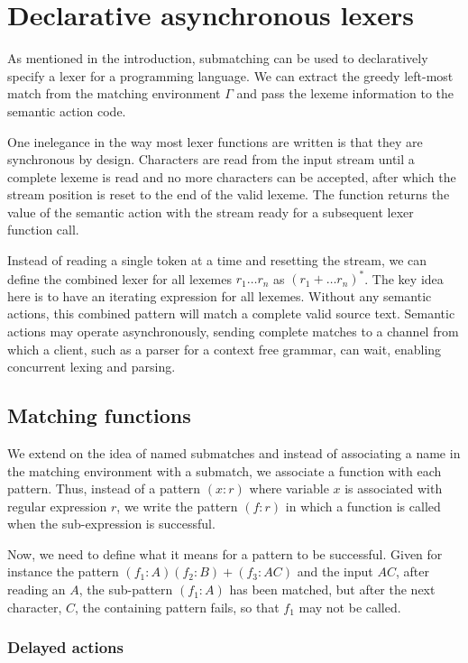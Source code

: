 \section{Declarative asynchronous lexers}
\label{lexer}

As mentioned in the introduction, submatching can be used to declaratively
specify a lexer for a programming language. We can extract the greedy left-most
match from the matching environment $\Gamma$ and pass the lexeme information to
the semantic action code.

One inelegance in the way most lexer functions are written is that they are
synchronous by design. Characters are read from the input stream until a
complete lexeme is read and no more characters can be accepted, after which the
stream position is reset to the end of the valid lexeme. The function returns
the value of the semantic action with the stream ready for a subsequent lexer
function call.

Instead of reading a single token at a time and resetting the stream, we can
define the combined lexer for all lexemes $r_1 \dots r_n$ as $(r_1 + \dots
r_n)^*$. The key idea here is to have an iterating expression for all lexemes.
Without any semantic actions, this combined pattern will match a complete valid
source text. Semantic actions may operate asynchronously, sending complete
matches to a channel from which a client, such as a parser for a context free
grammar, can wait, enabling concurrent lexing and parsing.


\subsection{Matching functions}

We extend on the idea of named submatches and instead of associating a name in
the matching environment with a submatch, we associate a function with each
pattern. Thus, instead of a pattern $(x:r)$ where variable $x$ is associated
with regular expression $r$, we write the pattern $(f:r)$ in which a function is
called when the sub-expression is successful.

Now, we need to define what it means for a pattern to be successful. Given for
instance the pattern $(f_1:A)(f_2:B)+(f_3:AC)$ and the input $AC$, after reading
an $A$, the sub-pattern $(f_1:A)$ has been matched, but after the next
character, $C$, the containing pattern fails, so that $f_1$ may not be called.

\subsubsection{Delayed actions}

